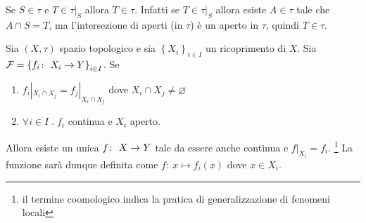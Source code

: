 \begin{remark}
	Se $S \in \tau$ e $T \in \tau|_S$ allora $T \in \tau$. Infatti se $T \in \tau|_S$ allora esiste $A \in \tau$ tale che $A \cap S = T$, ma l'intersezione di aperti (in $\tau$) è un aperto in $\tau$, quindi $T \in \tau$.
\end{remark}

\begin{theorem}
	Sia $(X,\tau)$ spazio topologico e sia $\left\{X_i\right\}_{i \in I}$ un ricoprimento di $X$. Sia $\mathcal{F} = \left\{ f_i \colon\ X_i \rightarrow Y\right\}_{i \in I}$. Se 
	\begin{enumerate}
		\item $f_i|_{X_i \cap X_j} = f_j|_{X_i \cap X_j}$ dove $X_i \cap X_j \neq \varnothing$
		\item $\forall i \in I \; . \; f_i$ continua e $X_i$ aperto.
	\end{enumerate}
	Allora esiste un unica $f \colon\ X \rightarrow Y$ tale da essere anche continua e $f|_{X_i} = f_i$. \footnote{il termine coomologico indica la pratica di generalizzazione di fenomeni locali}
	La funzione sarà dunque definita come $f \colon\ x \mapsto f_i(x)$ dove $x \in X_i$.
\end{theorem}
